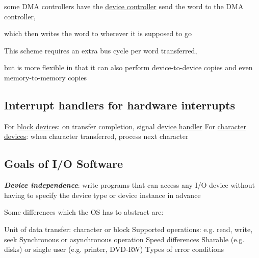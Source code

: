 \begin{itemize}
          \begin{itemize}

              \vItem
                    some DMA controllers have the \ul{device controller} send the word
                    to the DMA controller,

                    \begin{itemize}

                        \vItem
                              which then writes the word to wherever it is supposed to go
                    \end{itemize}
              \vItem
                    This scheme requires an extra bus cycle per word transferred,

                    \begin{itemize}

                        \vItem
                              but is more flexible in that it can also perform device-to-device
                              copies and even memory-to-memory copies
                    \end{itemize}
          \end{itemize}
\end{itemize}

\subsection*{Interrupt handlers for hardware interrupts}

\begin{itemize}

    \vItem
          For \ul{block devices}: on transfer completion, signal \ul{device handler}
    \vItem
          For \ul{character devices}: when character transferred, process next character
\end{itemize}

\subsection*{Goals of I/O Software}

\textbf{ \textit{Device independence}}: write programs that can access any
I/O device without having to specify the device type or device instance
in advance

\begin{itemize}

    \vItem
          Some differences which the OS has to abstract are:

          \begin{itemize}

              \vItem
                    Unit of data transfer: character or block
              \vItem
                    Supported operations: e.g. read, write, seek
              \vItem
                    Synchronous or asynchronous operation
              \vItem
                    Speed differences
              \vItem
                    Sharable (e.g. disks) or single user (e.g. printer, DVD-RW)
              \vItem
                    Types of error conditions
    \end{itemize}
\end{itemize}

